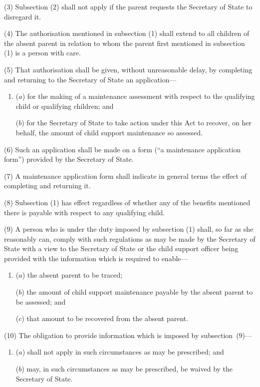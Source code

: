 \documentclass[12pt,a4paper]{article}
\begin{document}
(3) Subsection (2)  shall not apply if the parent requests the Secretary of State to disregard it.

(4) The authorisation mentioned in subsection (1)  shall extend to all children of the absent parent in relation to whom the parent first mentioned in subsection (1)  is a person with care.

(5) That authorisation shall be given, without unreasonable delay, by completing and returning to the Secretary of State an application—
\begin{enumerate}\item[]
($a$) for the making of a maintenance assessment with respect to the qualifying child or qualifying children; and

($b$) for the Secretary of State to take action under this Act to recover, on her behalf, the amount of child support maintenance so assessed.
\end{enumerate}

(6) Such an application shall be made on a form (“a maintenance application form”) provided by the Secretary of State.

(7) A maintenance application form shall indicate in general terms the effect of completing and returning it.

(8) Subsection (1)  has effect regardless of whether any of the benefits mentioned there is payable with respect to any qualifying child.

(9) A person who is under the duty imposed by subsection (1)  shall, so far as she reasonably can, comply with such regulations as may be made by the Secretary of State with a view to the Secretary of State or the child support officer being provided with the information which is required to enable—
\begin{enumerate}\item[]
($a$) the absent parent to be traced;

($b$) the amount of child support maintenance payable by the absent parent to be assessed; and

($c$) that amount to be recovered from the absent parent.
\end{enumerate}

(10) The obligation to provide information which is imposed by subsection~(9)—
\begin{enumerate}\item[]
($a$) shall not apply in such circumstances as may be prescribed; and

($b$) may, in such circumstances as may be prescribed, be waived by the Secretary of State.
\end{enumerate}
\end{document}

